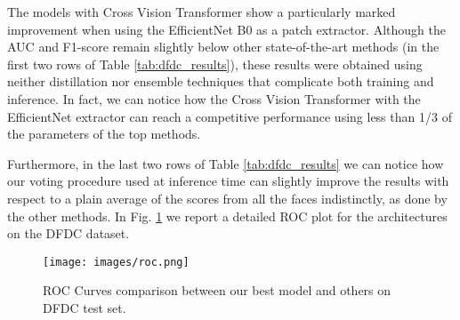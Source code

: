 \documentclass[runningheads]{llncs}
\begin{document}
\begin{table}[t]
\centering
\caption{Models accuracy on FaceForensics++} 
\label{tab:ff_results}
\end{table}

The models with Cross Vision Transformer show a particularly marked improvement when using the EfficientNet B0 as a patch extractor. Although the AUC and F1-score remain slightly below other state-of-the-art methods (in the first two rows of Table \ref{tab:dfdc_results}), these results were obtained using neither distillation nor ensemble techniques that complicate both training and inference. In fact, we can notice how the Cross Vision Transformer with the EfficientNet extractor can reach a competitive performance using less than 1/3 of the parameters of the top methods. 

Furthermore, in the last two rows of Table \ref{tab:dfdc_results} we can notice how our voting procedure used at inference time can slightly improve the results with respect to a plain average of the scores from all the faces indistinctly, as done by the other methods.
In Fig. \ref{figure:roc} we report a detailed ROC plot for the architectures on the DFDC dataset.

\begin{figure}[t]
    \centering
    \texttt{[image: images/roc.png]}
    \caption{ROC Curves comparison between our best model and others on DFDC test set.}
    \label{figure:roc}
\end{figure}
\end{document}
